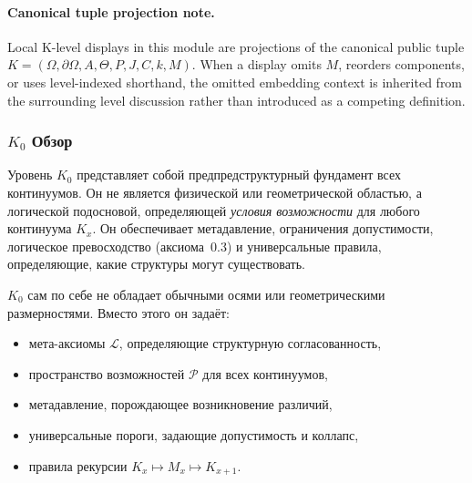 



\paragraph{Canonical tuple projection note.}
Local K-level displays in this module are projections of the canonical public tuple \(K=(\Omega,\partial\Omega,A,\Theta,P,J,C,k,M)\). When a display omits \(M\), reorders components, or uses level-indexed shorthand, the omitted embedding context is inherited from the surrounding level discussion rather than introduced as a competing definition.

\subsubsection{\texorpdfstring{$K_0$}{K_0} Обзор}
\label{sec:k0-overview}

Уровень $K_0$ представляет собой предпредструктурный фундамент всех континуумов.
Он не является физической или геометрической областью, а логической
подосновой, определяющей
\emph{условия возможности} для любого континуума $K_x$.
Он обеспечивает метадавление, ограничения допустимости, логическое
превосходство (аксиома~0.3) и универсальные правила, определяющие,
какие структуры могут существовать.

$K_0$ сам по себе не обладает обычными осями или геометрическими
размерностями.
Вместо этого он задаёт:
\begin{itemize}
    \item мета-аксиомы $\mathcal{L}$, определяющие структурную согласованность,
    \item пространство возможностей $\mathcal{P}$ для всех континуумов,
    \item метадавление, порождающее возникновение различий,
    \item универсальные пороги, задающие допустимость и коллапс,
    \item правила рекурсии $K_x \mapsto M_x \mapsto K_{x+1}$.
\end{itemize}

